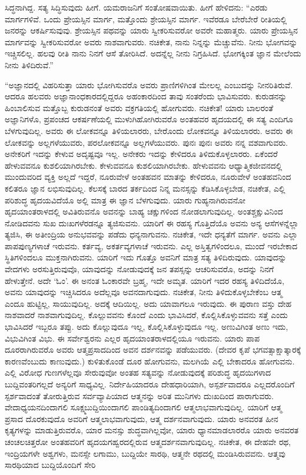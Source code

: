 ಸಿದ್ಧನಾಗಿದ್ದ. ಸತ್ಯ ಸಿದ್ಧಿಸುವುದು ಹೀಗೆ. ಯಮರಾಜನಿಗೆ ಸಂತೋಷವಾಯಿತು. ಹೀಗೆ ಹೇಳಿದನು: “ಎರಡು ಮಾರ್ಗಗಳಿವೆ. ಒಂದು ಪ್ರೇಯಸ್ಸಿನ ಮಾರ್ಗ, ಮತ್ತೊಂದು ಶ್ರೇಯಸ್ಸಿನ ಮಾರ್ಗ. ಇವೆರಡೂ ಬೇರೆಬೇರೆ ರೀತಿಯಲ್ಲಿ ಜನರನ್ನು ಆಕರ್ಷಿಸುವುವು. ಶ್ರೇಯಸ್ಸಿನ ಪಥವನ್ನು ಯಾರು ಸ್ವೀಕರಿಸುವರೋ ಅವರೇ ಮಹಾತ್ಮರು. ಯಾರು ಪ್ರೇಯಸ್ಸಿನ ಮಾರ್ಗವನ್ನು ಸ್ವೀಕರಿಸುವರೋ ಅವರು ನಾಶವಾಗುವರು. ನಚಿಕೇತ, ನಾನು ನಿನ್ನನ್ನು ಮೆಚ್ಚುವೆನು. ನೀನು ಭೋಗವನ್ನು ಇಚ್ಚಿಸಲಿಲ್ಲ. ಹಲವು ರೀತಿ ನಾನು ನಿನಗೆ ಆಸೆ ತೋರಿಸಿದೆ. ಅದನ್ನೆಲ್ಲ ನೀನು ನಿಗ್ರಹಿಸಿದೆ. ಭೋಗಕ್ಕಿಂತ ಜ್ಞಾನ ಮೇಲೆಂದು ನೀನು ತಿಳಿದಿರುವೆ.”

“ಅಜ್ಞಾನದಲ್ಲಿ ವಿಹರಿಸುತ್ತಾ ಯಾರು ಭೋಗಿಸುವರೊ ಅವರು ಪ್ರಾಣಿಗಳಿಗಿಂತ ಮೇಲಲ್ಲ ಎಂಬುದನ್ನು ನೀನರಿತಿರುವೆ. ಆದರೂ ಹಲವರು ಅಜ್ಞಾನಾಂಧಕಾರದಲ್ಲಿದ್ದರೂ ಅಹಂಕಾರದಿಂದ ತಾವು ಸಂತರೆಂದು ಭಾವಿಸುವರು. ಕುರುಡನನ್ನು ಹಿಂಬಾಲಿಸುವ ಮತ್ತೊಬ್ಬ ಕುರುಡನಂತೆ ಅವರು ವಕ್ರಗತಿಯಲ್ಲಿ ಹೋಗುವರು. ನಚಿಕೇತ! ಯಾರು ಬಾಲರಂತೆ ಅಜ್ಞಾನಿಗಳೊ, ಪ್ರಪಂಚದ ಆಕರ್ಷಣೆಯಲ್ಲಿ ಮುಳುಗಿಹೋಗಿರುವರೊ ಅಂತಹವರ ಹೃದಯದಲ್ಲಿ ಈ ಸತ್ಯ ಎಂದಿಗೂ ಬೆಳಗುವುದಿಲ್ಲ. ಅವರು ಈ ಲೋಕವನ್ನೂ ತಿಳಿಯಲಾರರು, ಬೇರೊಂದು ಲೋಕವನ್ನೂ ತಿಳಿಯಲಾರರು. ಅವರು ಈ ಲೋಕವನ್ನು ಅಲ್ಲಗಳೆಯುವರು, ಪರಲೋಕವನ್ನೂ ಅಲ್ಲಗಳೆಯುವರು. ಪುನಃ ಪುನಃ ಅವರು ನನ್ನ ವಶವಾಗುವರು. ಅನೇಕರಿಗೆ ಇದನ್ನು ಕೇಳುವ ಅದೃಷ್ಟವೂ ಇಲ್ಲ. ಅನೇಕರು ಇದನ್ನು ಕೇಳಿದರೂ ತಿಳಿದುಕೊಳ್ಳಲಾರರು. ಏಕೆಂದರೆ ಹೇಳುವವನೂ ಕುಶಲಿಯಾಗಿರಬೇಕು. ಕೇಳುವವನೂ ಕುಶಲಿಯಾಗಿರಬೇಕು. ಹೇಳುವವನು ಆಧ್ಯಾತ್ಮಿಕ\break ಜೀವನದಲ್ಲಿ ಮುಂದುವರಿದ ವ್ಯಕ್ತಿ ಅಲ್ಲದೆ ಇದ್ದರೆ, ನೂರುವೇಳೆ ಅಂತಹವನ ಮಾತನ್ನು ಕೇಳಿದರೂ, ನೂರುವೇಳೆ ಅಂತಹವನಿಂದ ಕಲಿತರೂ ಜ್ಞಾನ ಲಭಿಸುವುದಿಲ್ಲ. ಕೆಲಸಕ್ಕೆ ಬಾರದ ತರ್ಕದಿಂದ ನಿನ್ನ ಮನಸ್ಸನ್ನು ಕೆಡಿಸಿಕೊಳ್ಳಬೇಡ, ನಚಿಕೇತ, ಎಲ್ಲಿ ಪರಿಶುದ್ಧ ಹೃದಯವಿದೆಯೊ ಅಲ್ಲಿ ಮಾತ್ರ ಈ ಜ್ಞಾನ ಬೆಳಗುವುದು. ಯಾರು ಗುಹ್ಯನಾಗಿರುವನೋ ಹೃದಯಾಂತರಾಳದಲ್ಲಿ ಅವಿತಿರುವನೊ ಅವನನ್ನು ಬಾಹ್ಯ ಚಕ್ಷುಗಳಿಂದ ನೋಡಲಾಗುವುದಿಲ್ಲ. ಅಂತಶ್ಚಕ್ಷುವಿನಿಂದ ನೋಡಿದವನು ಸುಖ ದುಃಖಗಳೆರಡನ್ನೂ ತ್ಯಜಿಸುವನು. ಯಾರಿಗೆ ಈ ರಹಸ್ಯ ಗೊತ್ತಿದೆಯೊ ಅವನು ಅನ್ಯ ಆಸೆಗಳನ್ನೆಲ್ಲಾ ತ್ಯಜಿಸಿ, ಈ ಅತೀಂದ್ರಿಯ ಅನುಭವವನ್ನು ಪಡೆದು ಧನ್ಯನಾಗುವನು. ನಚಿಕೇತ, ಇದೇ ಧನ್ಯತೆಗೆ ಮಾರ್ಗ. ಅವನು ಎಲ್ಲಾ ಪಾಪಪುಣ್ಯಗಳಾಚೆ ಇರುವನು. ಕರ್ತವ್ಯ, ಅಕರ್ತವ್ಯಗಳಾಚೆ ಇರುವನು. ಎಲ್ಲ ಅಸ್ತಿತ್ವಗಳಿಂದಲೂ, ಮುಂದೆ ಇರಬೇಕಾದ ಸ್ಥಿತಿಗಳಿಂದಲೂ ಮುಕ್ತನಾಗಿರುವನು. ಯಾರಿಗೆ ಇದು ಗೊತ್ತೊ ಅವನಿಗೆ ಮಾತ್ರ ಸತ್ಯ ತಿಳಿದಿರುವುದು. ಯಾವುದನ್ನು ವೇದಗಳು ಅರಸುತ್ತಿರುವುವೊ, ಯಾವುದನ್ನು ನೋಡುವುದಕ್ಕೆ ಜನ ತಪಸ್ಸನ್ನು ಆಚರಿಸುವರೊ, ಅದನ್ನು ನಿನಗೆ ಹೇಳುತ್ತೇನೆ. ಅದೇ `ಓಂ'. ಈ ಅನಂತ ಓಂಕಾರವೇ ಬ್ರಹ್ಮ, ಇದೇ ಅಮೃತ. ಯಾರಿಗೆ ಇದರ ರಹಸ್ಯ ತಿಳಿದಿದೆಯೊ, ಅವನು ಯಾವುದನ್ನು ಇಚ್ಚಿಸಿದರೂ ಅದೆಲ್ಲವೂ ಅವನದಾಗುವುದು. ನಚಿಕೇತ, ನೀನು ತಿಳಿದುಕೊಳ್ಳಬೇಕೆಂಬ ಆತ್ಮ ಎಂದೂ ಹುಟ್ಟಿಲ್ಲ, ಸಾಯುವುದಿಲ್ಲ. ಅದಕ್ಕೆ ಆದಿಯಿಲ್ಲ. ಅದು ಯಾವಾಗಲೂ ಇರುವುದು. ಈ ಪುರಾಣ ವಸ್ತು ದೇಹ ನಾಶವಾದರೆ ನಾಶವಾಗುವುದಿಲ್ಲ. ಕೊಲ್ಲುವವನು ಕೊಂದೆ ಎಂದು ಭಾವಿಸಿದರೆ, ಕೊಲ್ಲಿಸಿಕೊಳ್ಳುವವನು ಸತ್ತೆ ಎಂದು ಭಾವಿಸಿದರೆ ಇಬ್ಬರೂ ತಪ್ಪು. ಅದು ಕೊಲ್ಲುವುದೂ ಇಲ್ಲ, ಕೊಲ್ಲಿಸಿಕೊಳ್ಳುವುದೂ ಇಲ್ಲ. ಅಣುವಿಗಿಂತ ಅಣು ಇದು, ವಿಭುವಿಗಿಂತ ವಿಭು. ಈ ಸರ್ವೇಶ್ವರನು ಎಲ್ಲರ ಹೃದಯಾಂತರಾಳದಲ್ಲಿಯೂ ಇರುವನು. ಯಾರು ಪಾಪ ದೂರರಾಗಿರುವರೊ ಅವರು ಆತ್ಮಪ್ರಸಾದದಿಂದ ಅವನ ದರ್ಶನವನ್ನು ಪಡೆಯುವರು. (ದೇವರ ಕೃಪೆ ಭಗವತ್ಸಾಕ್ಷಾತ್ಕಾರಕ್ಕೆ ಕಾರಣವೆಂಬುದು ಕಾಣುವುದು.) ಕುಳಿತುಕೊಂಡೆ ದೂರ ಹೋಗುವನು, ಮಲಗಿಯೆ ಎಲ್ಲಿ ಬೇಕಾದರೂ ಹೋಗುವನು. ಎಲ್ಲಿ ವಿರೋಧ ಗುಣಗಳೆಲ್ಲವೂ ಸೇರುವುವೋ ಅಂತಹ ಸತ್ಯವನ್ನು ನೋಡುವುದಕ್ಕೆ ಪರಿಶುದ್ಧ ಹೃದಯಿಗಳಾದ ಬುದ್ದಿವಂತರಿಗಲ್ಲದೆ ಅನ್ಯರಿಗೆ ಸಾಧ್ಯವಿಲ್ಲ. ನಿರ್ದೇಹಿಯಾದರೂ ದೇಹಧಾರಿಯಾಗಿ, ಅಸ್ಪರ್ಶವಾದರೂ ಎಲ್ಲದರೊಂದಿಗೆ ಸ್ಪರ್ಶವಾದಂತೆ ತೋರುತ್ತಿರುವ ಸರ್ವವ್ಯಾಪಿಯಾದ ಆತ್ಮನನ್ನು ಅರಿತ ಮುನಿಗಳು ದುಃಖದಿಂದ ಪಾರಾಗುವರು. ವೇದಾಧ್ಯಯನದಿಂದಾಗಲಿ ಸೂಕ್ಷ್ಮಬುದ್ದಿಯಿಂದಾಗಲಿ ಪಾಂಡಿತ್ಯದಿಂದಾಗಲಿ ಆತ್ಮಲಾಭವಾಗುವುದಿಲ್ಲ. ಯಾರಿಗೆ ಆತ್ಮ ಪ್ರಸಾದ ದೊರಕುವುದೊ ಅವರಿಗೆ ಆತ್ಮಲಾಭವಾಗುವುದು, ಆತ್ಮ ದರ್ಶನವಾಗುವುದು. ಯಾರು ಅನವರತ ಹೀನ ಕೃತ್ಯಗಳನ್ನು ಮಾಡುತ್ತಿರುವರೊ, ಯಾರ ಮನಸ್ಸು ಶುದ್ಧವಾಗಿಲ್ಲವೋ, ಯಾರು ಧ್ಯಾನಮಾಡಲಾರರೊ ಯಾರು ಅನವರತ ಚಂಚಲಚಿತ್ತರೋ ಅಂತಹವರಿಗೆ ಹೃದಯಗಹ್ವರದಲ್ಲಿರುವ ಆತ್ಮದರ್ಶನವಾಗುವುದಿಲ್ಲ. ನಚಿಕೇತ, ಈ ದೇಹವೇ ರಥ, ಇಂದ್ರಿಯಗಳೇ ಅಶ್ವಗಳು, ಮನಸ್ಸೇ ಲಗಾಮು, ಬುದ್ದಿಯೇ ಸಾರಥಿ, ಆತ್ಮನೇ ರಥದಲ್ಲಿ ಮಂಡಿಸಿರುವವನು. ಆತ್ಮವು ಸಾರಥಿಯಾದ ಬುದ್ದಿಯೊಂದಿಗೆ ಸೇರಿ 